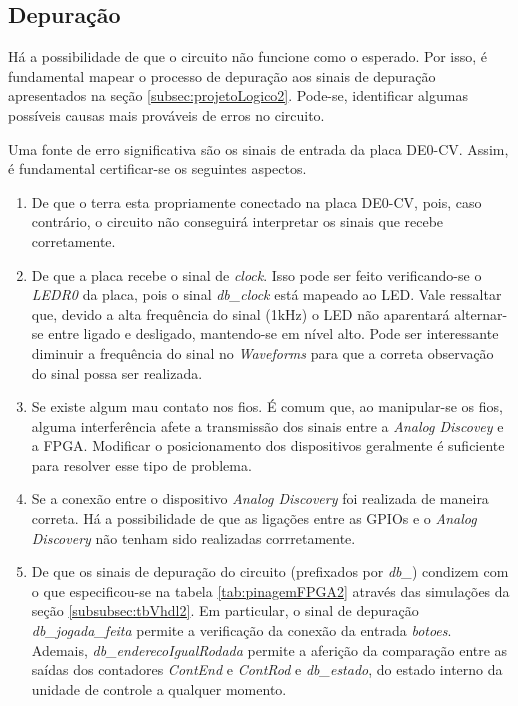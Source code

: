 \documentclass[amsmath,amssymb,floatfix]{report}
\begin{document}
\subsection{Depuração}
\label{subsec:depuracao2}

Há a possibilidade de que o circuito não funcione como o esperado. Por isso, é fundamental mapear o processo de depuração aos sinais de depuração apresentados na seção \ref{subsec:projetoLogico2}. Pode-se, identificar algumas possíveis causas mais prováveis de erros no circuito. 

Uma fonte de erro significativa são os sinais de entrada da placa DE0-CV. Assim, é fundamental certificar-se os seguintes aspectos.

\begin{enumerate}
    \item De que o terra esta propriamente conectado na placa DE0-CV, pois, caso contrário, o circuito não conseguirá interpretar os sinais que recebe corretamente.
   \item De que a placa recebe o sinal de \textit{clock}. Isso pode ser feito verificando-se o \textit{LEDR0} da placa, pois o sinal \textit{db\_clock} está mapeado ao LED. Vale ressaltar que, devido a alta frequência do sinal (1kHz) o LED não aparentará alternar-se entre ligado e desligado, mantendo-se em nível alto. Pode ser interessante diminuir a frequência do sinal no \textit{Waveforms} para que a correta observação do sinal possa ser realizada.
   \item Se existe algum mau contato nos fios. É comum que, ao manipular-se os fios, alguma interferência afete a transmissão dos sinais entre a \textit{Analog Discovey} e a FPGA. Modificar o posicionamento dos dispositivos geralmente é suficiente para resolver esse tipo de problema. 
   \item Se a conexão entre o dispositivo \textit{Analog Discovery} foi realizada de maneira correta. Há a possibilidade de que as ligações entre as GPIOs e o \textit{Analog Discovery} não tenham sido realizadas corrretamente.
   \item De que os sinais de depuração do circuito (prefixados por \textit{db\_}) condizem com o que especificou-se na tabela \ref{tab:pinagemFPGA2} através das simulações da seção \ref{subsubsec:tbVhdl2}. Em particular, o sinal de depuração \textit{db\_jogada\_feita} permite a verificação da conexão da entrada \textit{botoes}. Ademais, \textit{db\_enderecoIgualRodada} permite a aferição da comparação entre as saídas dos contadores \textit{ContEnd} e \textit{ContRod} e \textit{db\_estado}, do estado interno da unidade de controle a qualquer momento.
\end{enumerate}
\end{document}
